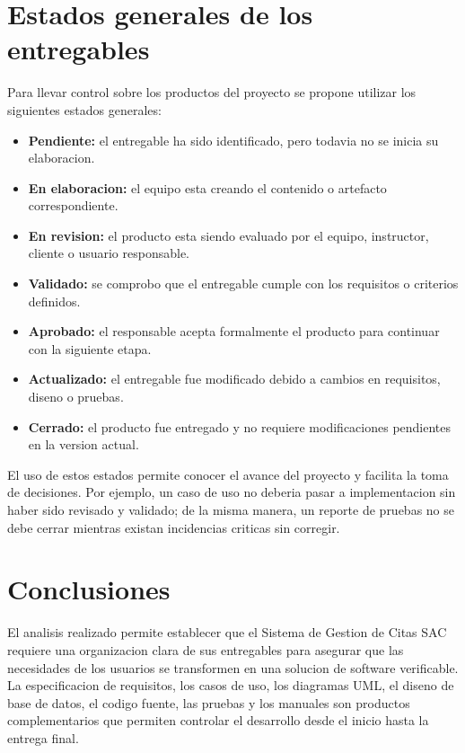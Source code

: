 \documentclass[12pt,letterpaper]{article}
\begin{document}
\section{Estados generales de los entregables}

Para llevar control sobre los productos del proyecto se propone utilizar los siguientes estados generales:

\begin{itemize}[leftmargin=1.2cm]
    \item \textbf{Pendiente:} el entregable ha sido identificado, pero todavia no se inicia su elaboracion.
    \item \textbf{En elaboracion:} el equipo esta creando el contenido o artefacto correspondiente.
    \item \textbf{En revision:} el producto esta siendo evaluado por el equipo, instructor, cliente o usuario responsable.
    \item \textbf{Validado:} se comprobo que el entregable cumple con los requisitos o criterios definidos.
    \item \textbf{Aprobado:} el responsable acepta formalmente el producto para continuar con la siguiente etapa.
    \item \textbf{Actualizado:} el entregable fue modificado debido a cambios en requisitos, diseno o pruebas.
    \item \textbf{Cerrado:} el producto fue entregado y no requiere modificaciones pendientes en la version actual.
\end{itemize}

El uso de estos estados permite conocer el avance del proyecto y facilita la toma de decisiones. Por ejemplo, un caso de uso no deberia pasar a implementacion sin haber sido revisado y validado; de la misma manera, un reporte de pruebas no se debe cerrar mientras existan incidencias criticas sin corregir.

\section{Conclusiones}

El analisis realizado permite establecer que el Sistema de Gestion de Citas SAC requiere una organizacion clara de sus entregables para asegurar que las necesidades de los usuarios se transformen en una solucion de software verificable. La especificacion de requisitos, los casos de uso, los diagramas UML, el diseno de base de datos, el codigo fuente, las pruebas y los manuales son productos complementarios que permiten controlar el desarrollo desde el inicio hasta la entrega final.
\end{document}
